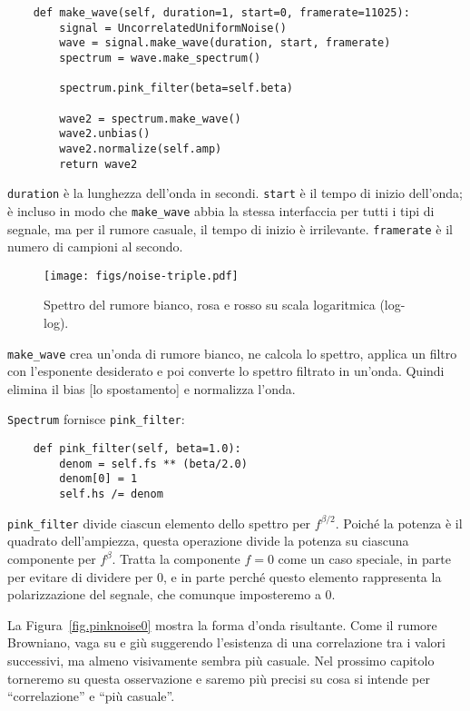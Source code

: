 \documentclass[12pt,a4paper]{book}
\begin{document}
\begin{verbatim} 
    def make_wave(self, duration=1, start=0, framerate=11025):
        signal = UncorrelatedUniformNoise()
        wave = signal.make_wave(duration, start, framerate)
        spectrum = wave.make_spectrum()

        spectrum.pink_filter(beta=self.beta)

        wave2 = spectrum.make_wave()
        wave2.unbias()
        wave2.normalize(self.amp)
        return wave2
 \end{verbatim} 

{\tt duration} è la lunghezza dell'onda in secondi. {\tt start} è il tempo di inizio dell'onda; è incluso in modo che \verb"make_wave" abbia la stessa interfaccia per tutti i tipi di segnale, ma per il rumore casuale, il tempo di inizio è irrilevante. {\tt framerate} è il numero di campioni al secondo.

\begin{figure} 

\centerline{\texttt{[image: figs/noise-triple.pdf]}} \caption{Spettro del rumore bianco, rosa e rosso su scala logaritmica (log-log).} \label{fig.noise-triple} \end{figure} 

\verb"make_wave" crea un'onda di rumore bianco, ne calcola lo spettro, applica un filtro con l'esponente desiderato e poi converte lo spettro filtrato in un'onda. Quindi elimina il bias [lo spostamento] e normalizza l'onda.

{\tt Spectrum} fornisce \verb"pink_filter":

\begin{verbatim} 
    def pink_filter(self, beta=1.0):
        denom = self.fs ** (beta/2.0)
        denom[0] = 1
        self.hs /= denom
 \end{verbatim} 

\verb"pink_filter" divide ciascun elemento dello spettro per $f^{\beta/2}$. Poiché la potenza è il quadrato dell'ampiezza, questa operazione divide la potenza su ciascuna componente per $f^\beta$. Tratta la componente $f=0$ come un caso speciale, in parte per evitare di dividere per 0, e in parte perché questo elemento rappresenta la polarizzazione del segnale, che comunque imposteremo a 0.

La Figura~\ref{fig.pinknoise0} mostra la forma d'onda risultante. Come il rumore Browniano, vaga su e giù suggerendo l'esistenza di una correlazione tra i valori successivi, ma almeno visivamente sembra più casuale. Nel prossimo capitolo torneremo su questa osservazione e saremo più precisi su cosa si intende per ``correlazione'' e ``più casuale''.
\end{document}
